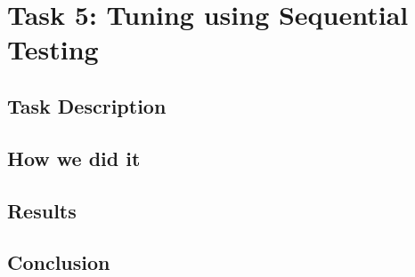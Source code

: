 \section{Task 5: Tuning using Sequential Testing}
\subsection{Task Description}
\subsection{How we did it}
\subsection{Results}
\subsection{Conclusion}